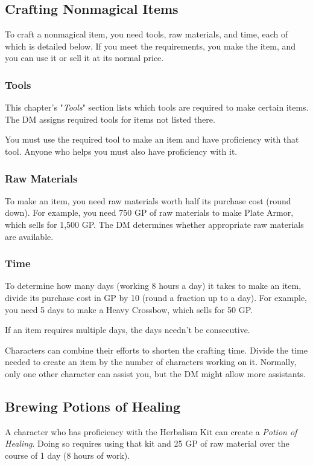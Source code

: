 \documentclass[10pt,a4paper,twoside,bg=print,twocolumn,openany,nodeprecatedcode]{dndbook}
\begin{document}
\subsection{Crafting Nonmagical Items}
To craft a nonmagical item, you need tools, raw materials, and time, each of which is detailed below. If you meet the requirements, you make the item, and you can use it or sell it at its normal price.

\subsubsection{Tools}
This chapter's "\textit{Tools}" section lists which tools are required to make certain items. The DM assigns required tools for items not listed there.

You must use the required tool to make an item and have proficiency with that tool. Anyone who helps you must also have proficiency with it.

\subsubsection{Raw Materials}
To make an item, you need raw materials worth half its purchase cost (round down). For example, you need 750 GP of raw materials to make Plate Armor, which sells for 1,500 GP. The DM determines whether appropriate raw materials are available.

\subsubsection{Time}
To determine how many days (working 8 hours a day) it takes to make an item, divide its purchase cost in GP by 10 (round a fraction up to a day). For example, you need 5 days to make a Heavy Crossbow, which sells for 50 GP.

If an item requires multiple days, the days needn't be consecutive.

Characters can combine their efforts to shorten the crafting time. Divide the time needed to create an item by the number of characters working on it. Normally, only one other character can assist you, but the DM might allow more assistants.

\subsection{Brewing Potions of Healing}
A character who has proficiency with the Herbalism Kit can create a \textit{Potion of Healing}. Doing so requires using that kit and 25 GP of raw material over the course of 1 day (8 hours of work).
\end{document}
